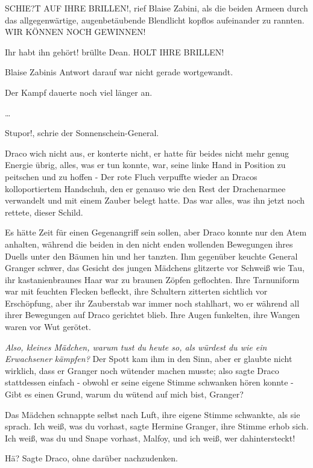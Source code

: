 \glqq SCHIE?T AUF IHRE BRILLEN!\grqq{}, rief Blaise Zabini, als die beiden
Armeen durch das allgegenwärtige, augenbetäubende Blendlicht kopflos aufeinander
zu rannten. \glqq WIR KÖNNEN NOCH GEWINNEN!\grqq{}

\glqq Ihr habt ihn gehört!\grqq{} brüllte Dean. \glqq HOLT IHRE BRILLEN!\grqq{}

Blaise Zabinis Antwort darauf war nicht gerade wortgewandt.

Der Kampf dauerte noch viel länger an.

…

\glqq Stupor!\grqq{}, schrie der Sonnenschein-General.

Draco wich nicht aus, er konterte nicht, er hatte für beides nicht mehr genug
Energie übrig, alles, was er tun konnte, war, seine linke Hand in Position zu
peitschen und zu hoffen - Der rote Fluch verpuffte wieder an Dracos
kolloportiertem Handschuh, den er genauso wie den Rest der Drachenarmee
verwandelt und mit einem Zauber belegt hatte. Das war alles, was ihn jetzt noch
rettete, dieser Schild.

Es hätte Zeit für einen Gegenangriff sein sollen, aber Draco konnte nur den Atem
anhalten, während die beiden in den nicht enden wollenden Bewegungen ihres
Duells unter den Bäumen hin und her tanzten. Ihm gegenüber keuchte General
Granger schwer, das Gesicht des jungen Mädchens glitzerte vor Schweiß wie Tau,
ihr kastanienbraunes Haar war zu braunen Zöpfen geflochten. Ihre Tarnuniform war
mit feuchten Flecken befleckt, ihre Schultern zitterten sichtlich vor
Erschöpfung, aber ihr Zauberstab war immer noch stahlhart, wo er während all
ihrer Bewegungen auf Draco gerichtet blieb. Ihre Augen funkelten, ihre Wangen
waren vor Wut gerötet.

\emph{Also, kleines Mädchen, warum tust du heute so, als würdest du wie ein
Erwachsener kämpfen?} Der Spott kam ihm in den Sinn, aber er glaubte nicht
wirklich, dass er Granger noch wütender machen musste; also sagte Draco
stattdessen einfach - obwohl er seine eigene Stimme schwanken hören konnte -
\glqq Gibt es einen Grund, warum du wütend auf mich bist, Granger?\grqq{}

Das Mädchen schnappte selbst nach Luft, ihre eigene Stimme schwankte, als sie
sprach. \glqq Ich weiß, was du vorhast\grqq{}, sagte Hermine Granger, ihre
Stimme erhob sich. \glqq Ich weiß, was du und Snape vorhast, Malfoy, und ich
weiß, wer dahintersteckt!\grqq{}

\glqq Hä?\grqq{} Sagte Draco, ohne darüber nachzudenken.

